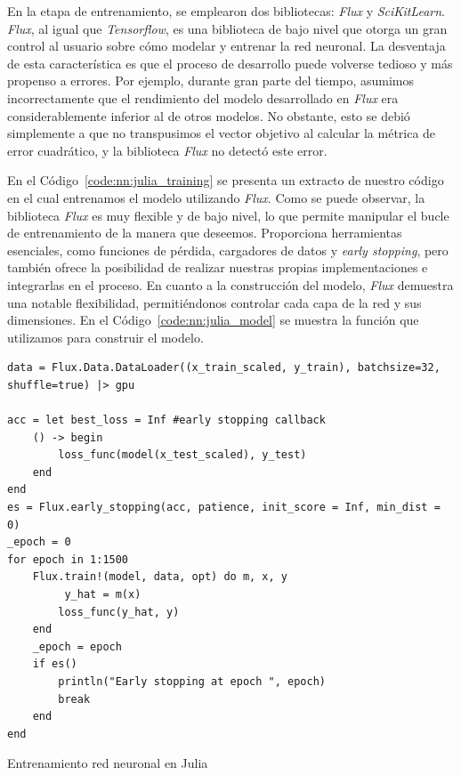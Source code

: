\documentclass[11pt]{article}
\begin{document}
En la etapa de entrenamiento, se emplearon dos bibliotecas: \textit{Flux} y \textit{SciKitLearn}. \textit{Flux}, al igual que \textit{Tensorflow}, es una biblioteca de bajo nivel que otorga un gran control al usuario sobre cómo modelar y entrenar la red neuronal. La desventaja de esta característica es que el proceso de desarrollo puede volverse tedioso y más propenso a errores. Por ejemplo, durante gran parte del tiempo, asumimos incorrectamente que el rendimiento del modelo desarrollado en \textit{Flux} era considerablemente inferior al de otros modelos. No obstante, esto se debió simplemente a que no transpusimos el vector objetivo al calcular la métrica de error cuadrático, y la biblioteca \textit{Flux} no detectó este error.

En el Código~\ref{code:nn:julia_training} se presenta un extracto de nuestro código en el cual entrenamos el modelo utilizando \textit{Flux}. Como se puede observar, la biblioteca \textit{Flux} es muy flexible y de bajo nivel, lo que permite manipular el bucle de entrenamiento de la manera que deseemos. Proporciona herramientas esenciales, como funciones de pérdida, cargadores de datos y \textit{early stopping}, pero también ofrece la posibilidad de realizar nuestras propias implementaciones e integrarlas en el proceso. En cuanto a la construcción del modelo, \textit{Flux} demuestra una notable flexibilidad, permitiéndonos controlar cada capa de la red y sus dimensiones. En el Código~\ref{code:nn:julia_model} se muestra la función que utilizamos para construir el modelo.

\begin{listing}[h]
\begin{verbatim}
data = Flux.Data.DataLoader((x_train_scaled, y_train), batchsize=32, shuffle=true) |> gpu
    
acc = let best_loss = Inf #early stopping callback
    () -> begin
        loss_func(model(x_test_scaled), y_test)
    end 
end
es = Flux.early_stopping(acc, patience, init_score = Inf, min_dist = 0)
_epoch = 0
for epoch in 1:1500
    Flux.train!(model, data, opt) do m, x, y
         y_hat = m(x)
        loss_func(y_hat, y)
    end
    _epoch = epoch
    if es()
        println("Early stopping at epoch ", epoch)
        break
    end
end
\end{verbatim}
\caption{Entrenamiento red neuronal en Julia}
\label{code:nn:julia_training}
\end{listing}
\end{document}
